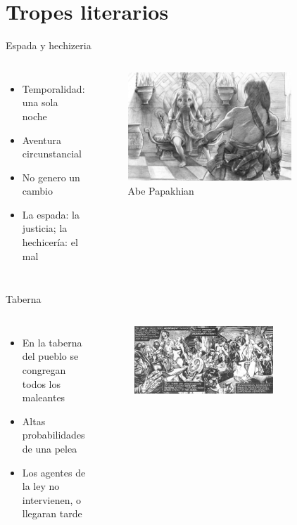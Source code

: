 \section{Tropes literarios}
\begin{frame}{Espada y hechizeria}
\begin{columns}
 \begin{itemize}
    \item Temporalidad: una sola noche
    \item Aventura circunstancial
    \item No genero un cambio
    \item La espada: la justicia; la hechicería: el mal
 \end{itemize}
 \begin{figure}[htb]
    \centering
    \includegraphics[width=0.8\textwidth]{img/tributos/elephant07}
    \caption{Abe Papakhian}
 \end{figure}
 \end{columns}
\end{frame}
\note{

}

\begin{frame}{Taberna}
	\begin{columns}
		\begin{itemize}
			\item En la taberna del pueblo se congregan todos los maleantes
			\item Altas probabilidades de una pelea
			\item Los agentes de la ley no intervienen, o llegaran tarde
		\end{itemize}
		\begin{figure}[htb]
			\centering
			\includegraphics[width=0.7\textwidth]{img/tropes/taberna}
		\end{figure}
	\end{columns}
\end{frame}
\note{

}

